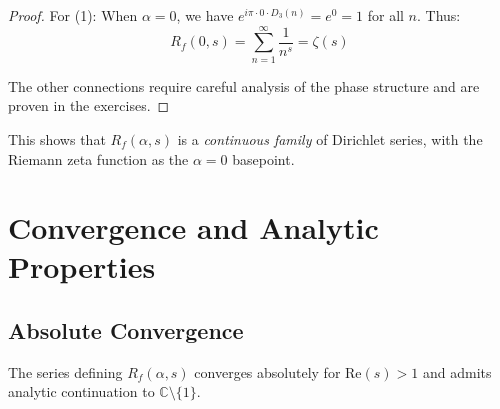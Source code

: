\begin{proof}
For (1): When $\alpha = 0$, we have $e^{i\pi \cdot 0 \cdot D_3(n)} = e^0 = 1$ for all $n$. Thus:
\begin{equation}
R_f(0, s) = \sum_{n=1}^{\infty} \frac{1}{n^s} = \zeta(s)
\end{equation}

The other connections require careful analysis of the phase structure and are proven in the exercises.
\end{proof}

This shows that $R_f(\alpha, s)$ is a \textit{continuous family} of Dirichlet series, with the Riemann zeta function as the $\alpha = 0$ basepoint.

\section{Convergence and Analytic Properties}
\label{sec:convergence}


\subsection{Absolute Convergence}

\begin{theorem}[Convergence of $R_f$]
\label{thm:rf-convergence}
The series defining $R_f(\alpha, s)$ converges absolutely for $\text{Re}(s) > 1$ and admits analytic continuation to $\mathbb{C} \setminus \{1\}$.
\end{theorem}

